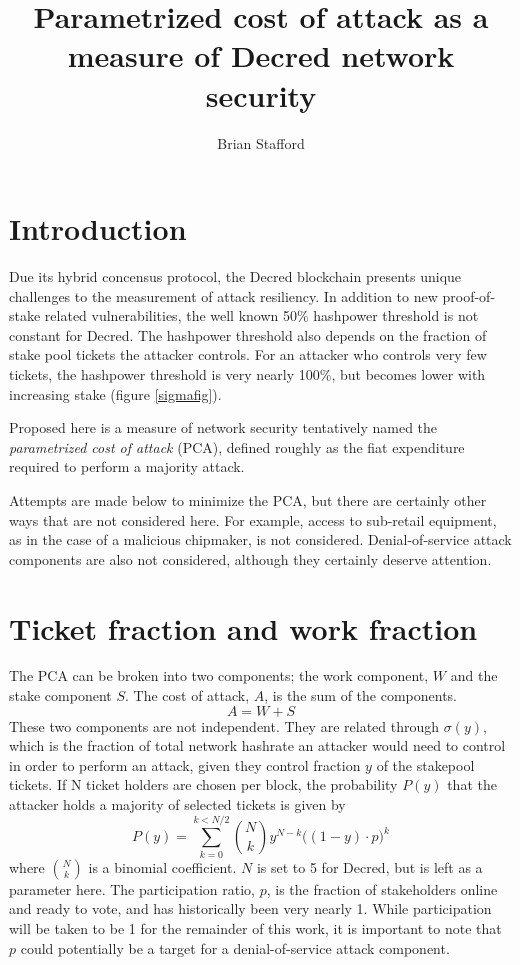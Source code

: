 \documentclass[a4paper,12pt]{article}
\begin{document}
\title{Parametrized cost of attack as a measure of Decred network security}
\author{Brian Stafford}
\maketitle

\section{Introduction}

Due its hybrid concensus protocol, the Decred blockchain presents unique challenges to the measurement of attack resiliency. In addition to new proof-of-stake related vulnerabilities, the well known 50\% hashpower threshold is not constant for Decred. The hashpower threshold also depends on the fraction of stake pool tickets the attacker controls. For an attacker who controls very few tickets, the hashpower threshold is very nearly 100\%, but becomes lower with increasing stake (figure \ref{sigmafig}). 


Proposed here is a measure of network security tentatively named the \emph{parametrized cost of attack} (PCA), defined roughly as the fiat expenditure required to perform a majority attack. 

Attempts are made below to minimize the PCA, but there are certainly other ways that are not considered here. For example, access to sub-retail equipment, as in the case of a malicious chipmaker, is not considered. Denial-of-service attack components are also not considered, although they certainly deserve attention. 

\section{Ticket fraction and work fraction}
The PCA can be broken into two components; the work component, $W$ and the stake component $S$. The cost of attack, $A$, is the sum of the components.
%
\begin{equation}
A = W + S
\end{equation}
%
These two components are not independent. They are related through $ \sigma(y) $, which is the fraction of total network hashrate an attacker would need to control in order to perform an attack, given they control fraction $ y $ of the stakepool tickets. If N ticket holders are chosen per block, the probability $ P(y) $ that the attacker holds a majority of selected tickets is given by 
%
\begin{equation}
P(y) = \sum_{k=0}^{k < N/2}  {{N}\choose{k}}   y^{N-k} \Big( (1-y) \cdot p \Big)^k
\end{equation}
%
where $ {{N}\choose{k}}  $ is a binomial coefficient. $ N $ is set to 5 for Decred, but is left as a parameter here. The participation ratio, $ p $, is the fraction of stakeholders online and ready to vote, and has historically been very nearly 1. While participation will be taken to be 1 for the remainder of this work, it is important to note that $ p $ could potentially be a target for a denial-of-service attack component. 
\end{document}
